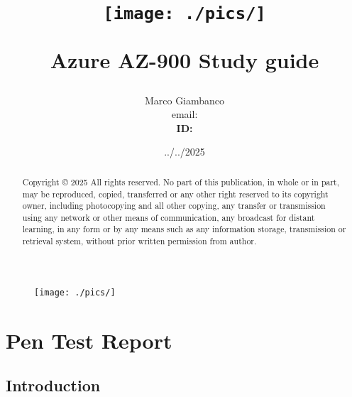 \documentclass[11pt, a4paper]{article}
\begin{document}
\pagestyle{fancy}

\title{
    \begin{figure}[h]
        \centering
        \texttt{[image: ./pics/]}
    \end{figure}    
Azure AZ-900 Study guide}
\author{Marco Giambanco \\ email: \href{mailto:}{} \\ \textbf{ID: }}
\date{../../2025}
\renewcommand*\contentsname{Table of Contents}
\maketitle

\renewcommand*\abstractname{Copyright}

\begin{abstract}
Copyright © 2025 All rights reserved.
No part of this publication, in whole or in part, may be reproduced, copied, transferred or any other right reserved to its copyright owner, including photocopying and all other copying, any transfer or transmission using any network or other means of communication, any broadcast for distant learning, in any form or by any means such as any information storage, transmission or retrieval system, without prior written permission from author.
\end{abstract}

\begin{figure}[h]
    \centering
    \texttt{[image: ./pics/]}
\end{figure}

\newpage

\tableofcontents

\newpage

\fancyhead{} %
\fancyfoot{} %
\fancyfoot[R]{\thepage}


\section{Pen Test Report}

\subsection{Introduction}
\end{document}
